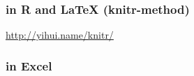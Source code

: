 \subsubsection{in R and \protect\LaTeX{} (knitr-method) \label{knitr}}

\url{http://yihui.name/knitr/}

\subsubsection{in Excel}